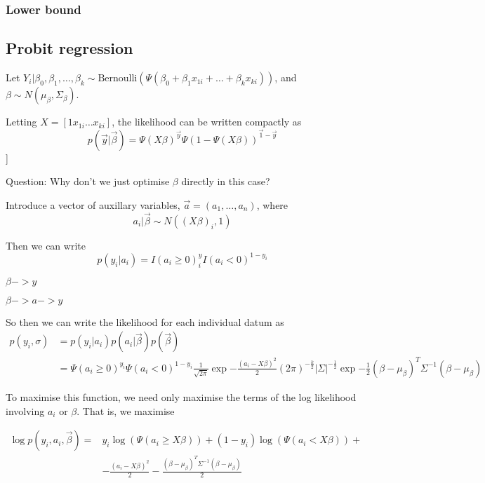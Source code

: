 \documentclass{amsart}
\newcommand{\Bernoulli}[1]{\text{Bernoulli} \left( #1 \right)}
\begin{document}
\subsubsection{Lower bound}

\subsection{Probit regression}
Let $Y_i|\beta_0, \beta_1, \ldots, \beta_k \sim \Bernoulli{\Psi(\beta_0 + \beta_1 x_{1i} + \ldots + \beta_k x_{ki})}$, and $\beta \sim N(\mu_\beta, \Sigma_\beta)$.

Letting $X = [1 x_{1i} \ldots x_{ki}]$, the likelihood can be written compactly as
\[
p(\vec{y}|\vec{\beta}) = \Psi(X \beta)^{\vec{y}} \Psi(1 - \Psi(X \beta))^{\vec{1} - \vec{y}}
\]]

Question: Why don't we just optimise $\beta$ directly in this case?

Introduce a vector of auxillary variables, $\vec{a} = (a_1, \ldots, a_n)$, where
\[
a_i | \vec{\beta} \sim N((X\beta)_i, 1)
\]

Then we can write
\[
p(y_i|a_i) = I(a_i \geq 0)^y_i I(a_i < 0)^{1-y_i}
\]

$\beta -> y$

$\beta -> a -> y$

So then we can write the likelihood for each individual datum as
\begin{align*}
	p(y_i, \sigma) &= p(y_i|a_i) p(a_i|\vec{\beta}) p(\vec{\beta}) \\
	&= \Psi(a_i \geq 0)^{y_i} \Psi(a_i < 0)^{1 - y_i} \frac{1}{\sqrt{2 \pi}} \exp{- \frac{(a_i - X \beta)^2}{2}} \left( 2 \pi \right)^{-\frac{k}{2}} |\Sigma|^{-\frac{1}{2}} \exp{-\frac{1}{2} (\beta - \mu_\beta)^T \Sigma^{-1} (\beta - \mu_\beta)}
\end{align*}

To maximise this function, we need only maximise the terms of the log likelihood
involving $a_i$ or $\beta$. That is, we maximise

\begin{align*}
\log{p(y_i, a_i, \vec{\beta})} =& y_i \log{(\Psi(a_i \geq X \beta))} + (1 - y_i) \log{(\Psi(a_i < X \beta))} + \\
&- \frac{(a_i - X \beta)^2}{2} - \frac{(\beta - \mu_\beta)^T \Sigma^{-1} (\beta - \mu_\beta)}{2}
\end{align*}
\end{document}
